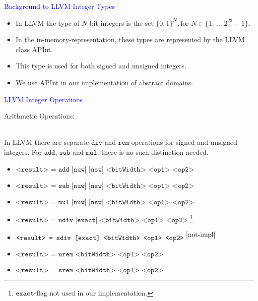 \begin{frame}[fragile]{\textcolor{blue}{Background to LLVM Integer Types}}
\begin{itemize}
\item In LLVM the type of $N$-bit integers is the set $\{0,1\}^N, \text{for~} N \in \{1,\dots, 2^{23}-1\}$.
\item In the in-memory-representation, these types are represented by the LLVM class APInt.
\item This type is used for both signed and unsigned integers.
 
\item We use APInt 	 in our implementation of abstract domains.

\end{itemize}

\end{frame}

\begin{frame}[fragile]{\textcolor{blue}{LLVM Integer Operations}}
\begin{large}Arithmetic Operations:\end{large} \\
In LLVM there are separate $\texttt{div}$ and $\texttt{rem}$ operations for signed and unsigned integers. 
For $\texttt{add}$, $\texttt{sub}$ and $\texttt{mul}$, there is no such distinction needed.
\begin{itemize}
\item $\texttt{<result> = add [nuw] [nsw] <bitWidth> <op1> <op2>}$
\item $\texttt{<result> = sub [nuw] [nsw] <bitWidth> <op1> <op2>}$
\item $\texttt{<result> = mul [nuw] [nsw] <bitWidth> <op1> <op2>}$
\item $\texttt{<result> = udiv [exact] <bitWidth> <op1> <op2>}$ 
\footnote{\label{not-impl} $\texttt{exact}$-flag not used in our implementation.}
\item $\texttt{<result> = sdiv [exact] <bitWidth> <op1> <op2>} ^{~\ref{not-impl}}$
\item $\texttt{<result> = urem <bitWidth> <op1> <op2>}$
\item $\texttt{<result> = srem <bitWidth> <op1> <op2>}$
\end{itemize}

\end{frame}

